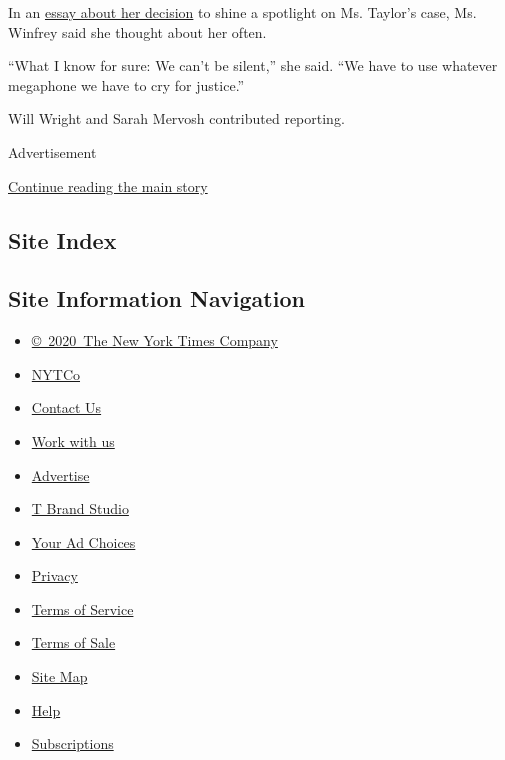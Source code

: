 In an
\href{https://www.oprahmag.com/life/a33449982/oprah-breonna-taylor/}{essay
about her decision} to shine a spotlight on Ms. Taylor's case, Ms.
Winfrey said she thought about her often.

``What I know for sure: We can't be silent,'' she said. ``We have to use
whatever megaphone we have to cry for justice.''

Will Wright and Sarah Mervosh contributed reporting.

Advertisement

\protect\hyperlink{after-bottom}{Continue reading the main story}

\hypertarget{site-index}{%
\subsection{Site Index}\label{site-index}}

\hypertarget{site-information-navigation}{%
\subsection{Site Information
Navigation}\label{site-information-navigation}}

\begin{itemize}
\tightlist
\item
  \href{https://help.nytimes.com/hc/en-us/articles/115014792127-Copyright-notice}{©~2020~The
  New York Times Company}
\end{itemize}

\begin{itemize}
\tightlist
\item
  \href{https://www.nytco.com/}{NYTCo}
\item
  \href{https://help.nytimes.com/hc/en-us/articles/115015385887-Contact-Us}{Contact
  Us}
\item
  \href{https://www.nytco.com/careers/}{Work with us}
\item
  \href{https://nytmediakit.com/}{Advertise}
\item
  \href{http://www.tbrandstudio.com/}{T Brand Studio}
\item
  \href{https://www.nytimes.com/privacy/cookie-policy\#how-do-i-manage-trackers}{Your
  Ad Choices}
\item
  \href{https://www.nytimes.com/privacy}{Privacy}
\item
  \href{https://help.nytimes.com/hc/en-us/articles/115014893428-Terms-of-service}{Terms
  of Service}
\item
  \href{https://help.nytimes.com/hc/en-us/articles/115014893968-Terms-of-sale}{Terms
  of Sale}
\item
  \href{https://spiderbites.nytimes.com}{Site Map}
\item
  \href{https://help.nytimes.com/hc/en-us}{Help}
\item
  \href{https://www.nytimes.com/subscription?campaignId=37WXW}{Subscriptions}
\end{itemize}
